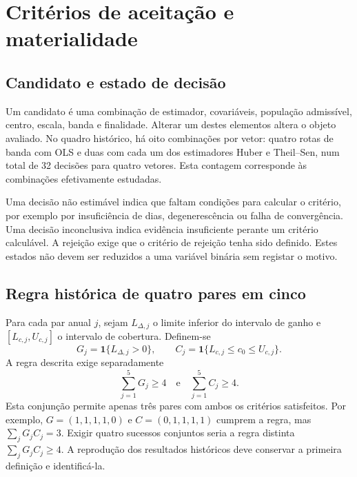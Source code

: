 \section{Critérios de aceitação e materialidade}
\label{sec:mat-aceitacao}

\subsection{Candidato e estado de decisão}
\label{sec:mat-candidato}
Um candidato é uma combinação de estimador, covariáveis, população admissível, centro, escala, banda e finalidade. Alterar um destes elementos altera o objeto avaliado. No quadro histórico, há oito combinações por vetor: quatro rotas de banda com OLS e duas com cada um dos estimadores Huber e Theil--Sen, num total de 32 decisões para quatro vetores. Esta contagem corresponde às combinações efetivamente estudadas.

Uma decisão não estimável indica que faltam condições para calcular o critério, por exemplo por insuficiência de dias, degenerescência ou falha de convergência. Uma decisão inconclusiva indica evidência insuficiente perante um critério calculável. A rejeição exige que o critério de rejeição tenha sido definido. Estes estados não devem ser reduzidos a uma variável binária sem registar o motivo.

\subsection{Regra histórica de quatro pares em cinco}
\label{sec:mat-quatro-cinco}
Para cada par anual $j$, sejam $L_{\Delta,j}$ o limite inferior do intervalo de ganho e $[L_{c,j},U_{c,j}]$ o intervalo de cobertura. Definem-se
\begin{equation}
G_j=\mathbf1\{L_{\Delta,j}>0\},
\qquad C_j=\mathbf1\{L_{c,j}\leq c_0\leq U_{c,j}\}.
\label{eq:mat-indicadores-gate}
\end{equation}
A regra descrita exige separadamente
\begin{equation}
\sum_{j=1}^{5}G_j\geq4
\quad\text{e}\quad
\sum_{j=1}^{5}C_j\geq4.
\label{eq:mat-gate-historico}
\end{equation}
Esta conjunção permite apenas três pares com ambos os critérios satisfeitos. Por exemplo, $G=(1,1,1,1,0)$ e $C=(0,1,1,1,1)$ cumprem a regra, mas $\sum_jG_jC_j=3$. Exigir quatro sucessos conjuntos seria a regra distinta $\sum_jG_jC_j\geq4$. A reprodução dos resultados históricos deve conservar a primeira definição e identificá-la.


